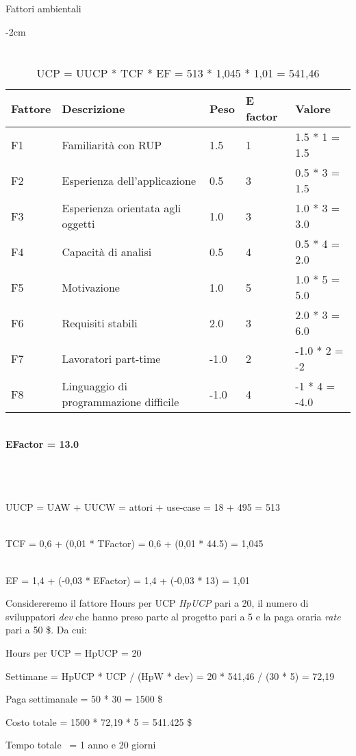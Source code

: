\begin{table}[hb]
\caption{Fattori ambientali}
    \centering
        \addtolength{\leftskip} {-2cm}
\begin{tabular}{ |P{2.5cm}|P{5cm}|P{2.5cm}|P{2.5cm}|P{2.5cm}|  }
\hline
\textbf{Fattore} & \textbf{Descrizione} & \textbf{Peso} & \textbf{E factor} & \textbf{Valore} \\\hline
F1 & Familiarità con RUP & 1.5 & 1 & 1.5 * 1 = 1.5\\\hline
F2 & Esperienza dell'applicazione & 0.5& 3& 0.5 * 3 = 1.5\\\hline
F3 & Esperienza orientata agli oggetti & 1.0& 3& 1.0 * 3 = 3.0\\\hline
F4 & Capacità di analisi  & 0.5& 4& 0.5 * 4 = 2.0\\\hline
F5 & Motivazione & 1.0& 5& 1.0 * 5 = 5.0\\\hline
F6 & Requisiti stabili & 2.0& 3& 2.0 * 3 = 6.0\\\hline
F7 & Lavoratori part-time & -1.0& 2& -1.0 * 2 = -2\\\hline
F8 & Linguaggio di programmazione difficile & -1.0& 4& -1 * 4 = -4.0\\\hline
\end{tabular}
\caption*{\\\textbf{EFactor = 13.0}\\~\\}
\caption*{\\~\\\large{UUCP = UAW + UUCW = attori + use-case = 18 + 495 = 513}}
\caption*{\\\large{TCF = 0,6 + (0,01 * TFactor) = 0,6 + (0,01 * 44.5) = 1,045}}
\caption*{\\\large{EF = 1,4 + (-0,03 * EFactor) = 1,4 + (-0,03 * 13) = 1,01}}
\caption*{\\\large{UCP = UUCP * TCF * EF = 513 * 1,045 * 1,01 = 541,46}}
\end{table}

\clearpage

\noindent Considereremo il fattore Hours per UCP \emph{HpUCP} pari a 20, il numero di sviluppatori \emph{dev} che hanno preso parte al progetto pari a 5 e la paga oraria \emph{rate} pari a 50 \$. Da cui:

\vspace{1.0cm}
\centerline{\large{Hours per UCP = HpUCP = 20}}\vspace{0.5cm}
\centerline{\large{Settimane = HpUCP * UCP / (HpW * dev) = 20 * 541,46 / (30 * 5) = 72,19}}\vspace{0.5cm}
\centerline{\large{Paga settimanale = 50 * 30 = 1500 \$}}\vspace{0.5cm}
\centerline{\large{Costo totale = 1500 * 72,19 * 5 = 541.425 \$}}\vspace{0.5cm}
\centerline{\large{Tempo totale ~= 1 anno e 20 giorni}}\vspace{1.0cm}

